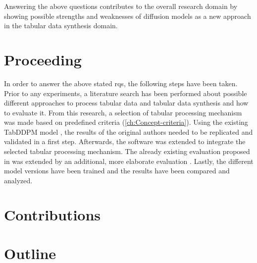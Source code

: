 Answering the above questions contributes to the overall research domain by showing possible strengths and weaknesses of diffusion models
as a new approach in the tabular data synthesis domain. 

\section{Proceeding}
\label{ch:intro-proceeding}
In order to answer the above stated \glspl{rq}, the following steps have been taken.
Prior to any experiments, a literature search has been performed about possible different approaches to process tabular data and tabular data synthesis and how to evaluate it.
From this research, a selection of tabular processing mechanism was made based on predefined criteria (\autoref{ch:Concept-criteria}).
Using the existing TabDDPM model \cite{kotelnikov2022TabDDPMModellingTabular}, the results of the original authors needed to be replicated and validated in a first step.
Afterwards, the software was extended to integrate the selected tabular processing mechanism.
The already existing evaluation proposed in \cite{kotelnikov2022TabDDPMModellingTabular} was extended by an additional, more elaborate evaluation \cite{akim2023TabDDPMModellingTabular}.
Lastly, the different model versions have been trained and the results have been compared and analyzed.

\section{Contributions}
\label{ch:intro-contributions}

\section{Outline}
\label{ch:intro-outline}
